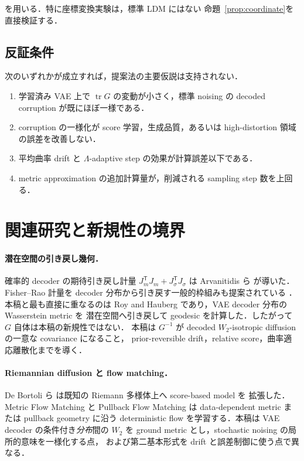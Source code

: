 \documentclass[uplatex,dvipdfmx,11pt,a4paper]{jsarticle}
\begin{document}
を用いる．特に座標変換実験は，標準 LDM にはない
命題~\ref{prop:coordinate}を直接検証する．

\subsection{反証条件}

次のいずれかが成立すれば，提案法の主要仮説は支持されない．

\begin{enumerate}
  \item 学習済み VAE 上で $\operatorname{tr}G$ の変動が小さく，標準 noising の
    decoded corruption が既にほぼ一様である．
  \item corruption の一様化が score 学習，生成品質，あるいは high-distortion
    領域の誤差を改善しない．
  \item 平均曲率 drift と $\Lambda$-adaptive step の効果が計算誤差以下である．
  \item metric approximation の追加計算量が，削減される sampling step 数を上回る．
\end{enumerate}

\section{関連研究と新規性の境界}
\label{sec:related}

\paragraph{潜在空間の引き戻し幾何．}
確率的 decoder の期待引き戻し計量
$J_m^{\mathsf T}J_m+J_\sigma^{\mathsf T}J_\sigma$ は
Arvanitidis ら \cite{arvanitidis2018} が導いた．Fisher--Rao 計量を
decoder 分布から引き戻す一般的枠組みも提案されている
\cite{arvanitidis2022}．本稿と最も直接に重なるのは
Roy and Hauberg \cite{roy2022} であり，VAE decoder 分布の Wasserstein metric を
潜在空間へ引き戻して geodesic を計算した．したがって $G$ 自体は本稿の新規性ではない．
本稿は $G^{-1}$ が decoded $W_2$-isotropic diffusion の一意な covariance になること，
prior-reversible drift，relative score，曲率適応離散化までを導く．

\paragraph{Riemannian diffusion と flow matching．}
De Bortoli ら \cite{debortoli2022} は既知の Riemann 多様体上へ score-based model を
拡張した．Metric Flow Matching \cite{kapusniak2024} と Pullback Flow Matching
\cite{dekruiff2024} は data-dependent metric または pullback geometry に沿う
deterministic flow を学習する．本稿は VAE decoder の条件付き\emph{分布}間の
$W_2$ を ground metric とし，stochastic noising の局所的意味を一様化する点，
および第二基本形式を drift と誤差制御に使う点で異なる．
\end{document}

